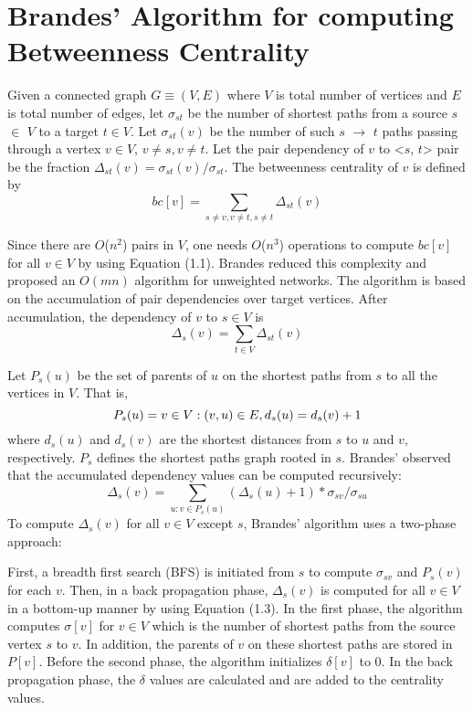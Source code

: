 
\chapter{Brandes' Algorithm for computing Betweenness Centrality}
\label{chap:lit}

Given a connected graph $G \equiv (V,E)$ where $V$ is total number of vertices and $E$ is total number of edges, let  $\sigma_{st}$  be the number of shortest paths from a source $s$ $\in$ $V$ to a target $t\in V$. Let $\sigma_{st} (v)$ be the number of such $s$ $\rightarrow$ $t$ paths passing through a vertex $v \in V $, $v \neq s,v \neq t$. Let the pair dependency of $v$ to <$s$, $t$> pair be
the fraction $\Delta_{st}(v) =\sigma_{st}(v) / \sigma_{st}$. The betweenness centrality of $v$ is defined by
\begin{equation} \label{eq1}
bc[v]={\sum_{s \neq v,v \neq t,s \neq t}}  \Delta_{st}(v)   
\end{equation}

Since there are $O$($n^2$) pairs in $V$, one needs $O$($n^3$) operations to compute $bc[v]$ for all $v \in V$ by using Equation (1.1). Brandes reduced this complexity and proposed an $O(mn)$ algorithm for unweighted networks. The algorithm is based on the accumulation of pair dependencies over target vertices.
After accumulation, the dependency of $v$ to $s \in V$ is 
\vspace{-0.1em}
\begin{equation} \label{eq2}
\Delta_{s}(v) = {\sum_{t \in V}}\Delta_{st}(v)
\end{equation}

Let $P_{s}(u)$ be the set of parents of $u$ on the shortest paths from $s$ to all the vertices in $V$. That is,\[  P_{s}(u) = \\{v \in V : (v, u) \in E, d_{s}(u)=d_{s}(v)+ 1\\} \]
where $d_{s}(u)$ and $d_{s}(v)$ are the shortest distances from $s$ to $u$ and $v$, respectively.
$P_{s}$ defines the shortest paths graph rooted in $s$. Brandes' observed that the accumulated dependency values can be computed recursively:
\begin{equation} \label{eq3}
\Delta_{s}(v) = \sum_{u:v \in P_{s}(u)} (\Delta_{s}(u)+1)*\sigma_{sv}/\sigma_{su}
\end{equation}
To compute $\Delta_{s}(v)$ for all $v \in V$ except $s$, Brandes' algorithm uses a two-phase approach:

First, a breadth first search (BFS) is initiated from $s$ to compute $\sigma_{sv}$ and $P_{s}(v)$ for each $v$. Then, in a back propagation phase, $\Delta_{s}(v)$ is computed for all $v \in V$ in a bottom-up manner by using Equation (1.3).
In the first phase, the algorithm computes $\sigma[v]$ for $v \in V$ which is the number of shortest paths from the source vertex $s$ to $v$. In addition, the parents of $v$ on these shortest paths are stored in $P[v]$. Before the second phase, the algorithm initializes $\delta[v]$ to 0. 
In the back propagation phase, the $\delta$  values are calculated and are added to the centrality values.

